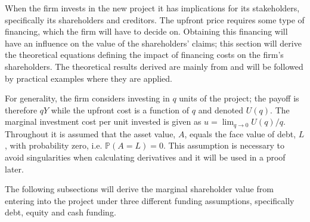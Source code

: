 \documentclass[main.tex]{subfiles}
\begin{document}
    When the firm invests in the new project it has implications for its stakeholders,
    specifically its shareholders and creditors.
    The upfront price requires some type of financing, 
    which the firm will have to decide on.
    Obtaining this financing will have an influence on the value of the shareholders' claims;
    this section will derive the theoretical equations defining
    the impact of financing costs on the firm's shareholders.
    The theoretical results derived are mainly from \textcite{ADS2019} 
    and will be followed by practical examples where they are applied.

    For generality, the firm considers investing in $q$ units of the project; 
    the payoff is therefore $qY$ while the upfront cost is a function of $q$ and denoted $U(q)$. 
    The marginal investment cost per unit invested is given as 
    $u = \lim_{q\rightarrow 0} U(q) / q$.
    Throughout it is assumed that the asset value, $A$, equals the face value of debt, $L$, 
    with probability zero, i.e. $\mathbb{P}\left(A = L\right) = 0$.
    This assumption is necessary to avoid singularities when calculating derivatives
    and it will be used in a proof later.

    The following subsections will derive the marginal shareholder value from entering into the project
    under three different funding assumptions, specifically debt, equity and cash funding.
\end{document}
